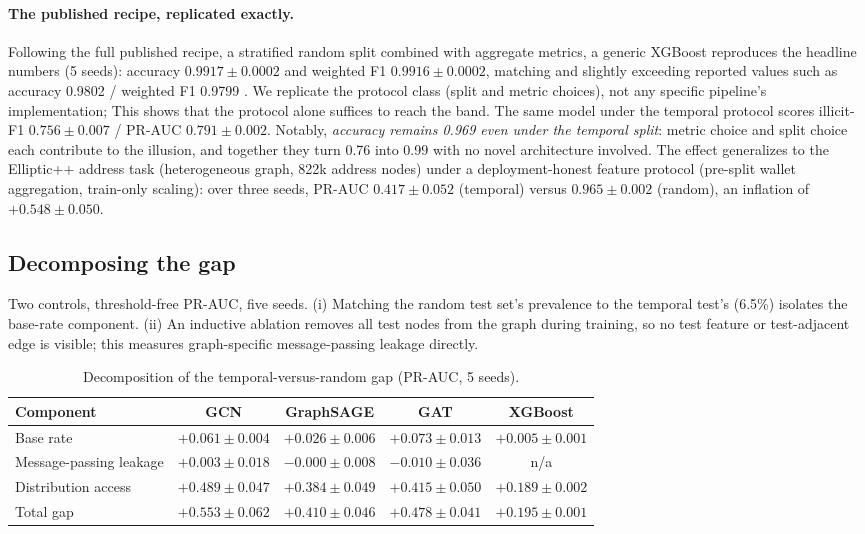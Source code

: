 \documentclass[10pt]{article}
\begin{document}
\paragraph{The published recipe, replicated exactly.} Following the full published
recipe, a stratified random split combined with aggregate metrics, a generic
XGBoost reproduces the headline numbers (5 seeds): accuracy
$0.9917\pm0.0002$ and weighted F1 $0.9916\pm0.0002$, matching and slightly
exceeding reported values such as accuracy 0.9802 / weighted F1 0.9799
\citep{lin2026wavelet}. We replicate the protocol class (split and metric
choices), not any specific pipeline's implementation; This shows that the
protocol alone suffices to reach the band. The same
model under the temporal protocol scores illicit-F1 $0.756\pm0.007$ / PR-AUC
$0.791\pm0.002$. Notably, \emph{accuracy remains 0.969 even under the temporal
split}: metric choice and split choice each contribute to the illusion, and
together they turn 0.76 into 0.99 with no novel architecture involved. The effect
generalizes to the Elliptic++ address task (heterogeneous graph, 822k address
nodes) under a deployment-honest feature protocol (pre-split wallet aggregation,
train-only scaling): over three seeds, PR-AUC $0.417\pm0.052$ (temporal) versus
$0.965\pm0.002$ (random), an inflation of $+0.548\pm0.050$.

\subsection{Decomposing the gap}
\label{sec:decompose}
Two controls, threshold-free PR-AUC, five seeds. (i) Matching the random test
set's prevalence to the temporal test's (6.5\%) isolates the base-rate component.
(ii) An inductive ablation removes all test nodes from the graph during training,
so no test feature or test-adjacent edge is visible; this measures graph-specific
message-passing leakage directly.

\begin{table}[h]
\centering
\caption{Decomposition of the temporal-versus-random gap (PR-AUC, 5 seeds).}
\label{tab:decompose}
\begin{tabular}{lcccc}
\toprule
Component & GCN & GraphSAGE & GAT & XGBoost \\
\midrule
Base rate & $+0.061\pm0.004$ & $+0.026\pm0.006$ & $+0.073\pm0.013$ & $+0.005\pm0.001$ \\
Message-passing leakage & $+0.003\pm0.018$ & $-0.000\pm0.008$ & $-0.010\pm0.036$ & n/a \\
Distribution access & $+0.489\pm0.047$ & $+0.384\pm0.049$ & $+0.415\pm0.050$ & $+0.189\pm0.002$ \\
\midrule
Total gap & $+0.553\pm0.062$ & $+0.410\pm0.046$ & $+0.478\pm0.041$ & $+0.195\pm0.001$ \\
\bottomrule
\end{tabular}
\end{table}
\end{document}
